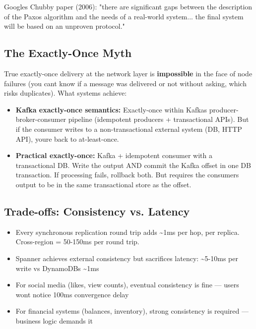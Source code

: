 \documentclass[11pt]{article}
\providecommand{\tightlist}{\setlength{\itemsep}{1pt}\setlength{\parskip}{0pt}}
\begin{document}
Google\textquotesingle s Chubby paper (2006): "there are significant gaps between the description of the Paxos algorithm and the needs of a real-world system... the final system will be based on an unproven protocol."

\subsection{The Exactly-Once Myth}\label{the-exactly-once-myth}

True exactly-once delivery at the network layer is \textbf{impossible} in the face of node failures (you can\textquotesingle t know if a message was delivered or not without asking, which risks duplicates). What systems achieve:

\begin{itemize}
\tightlist
\item
  \textbf{Kafka exactly-once semantics:} Exactly-once within Kafka\textquotesingle s producer-broker-consumer pipeline (idempotent producers + transactional APIs). But if the consumer writes to a non-transactional external system (DB, HTTP API), you\textquotesingle re back to at-least-once.
\item
  \textbf{Practical exactly-once:} Kafka + idempotent consumer with a transactional DB. Write the output AND commit the Kafka offset in one DB transaction. If processing fails, rollback both. But requires the consumer\textquotesingle s output to be in the same transactional store as the offset.
\end{itemize}

\subsection{Trade-offs: Consistency vs. Latency}\label{trade-offs-consistency-vs-latency}

\begin{itemize}
\tightlist
\item
  Every synchronous replication round trip adds \textasciitilde1ms per hop, per replica. Cross-region = 50-150ms per round trip.
\item
  Spanner achieves external consistency but sacrifices latency: \textasciitilde5-10ms per write vs DynamoDB\textquotesingle s \textasciitilde1ms
\item
  For social media (likes, view counts), eventual consistency is fine --- users won\textquotesingle t notice 100ms convergence delay
\item
  For financial systems (balances, inventory), strong consistency is required --- business logic demands it
\end{itemize}
\end{document}
